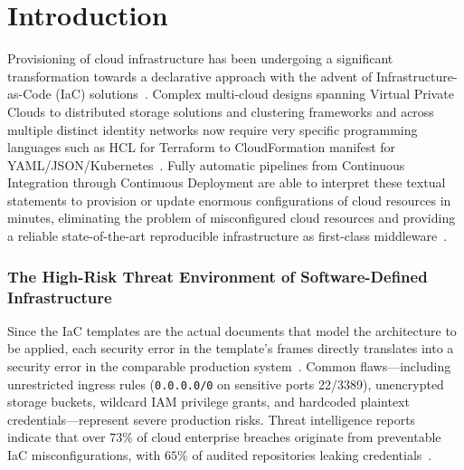 \documentclass[runningheads]{llncs}
\begin{document}
\section{Introduction}
Provisioning of cloud infrastructure has been undergoing a significant transformation towards a declarative approach with the advent of Infrastructure-as-Code (IaC) solutions~\cite{morris2021infrastructure}. Complex multi-cloud designs spanning Virtual Private Clouds to distributed storage solutions and clustering frameworks and across multiple distinct identity networks now require very specific programming languages such as HCL for Terraform to CloudFormation manifest for YAML/JSON/Kubernetes~\cite{guerriero2023static,rahman2023threats}. Fully automatic pipelines from Continuous Integration through Continuous Deployment are able to interpret these textual statements to provision or update enormous configurations of cloud resources in minutes, eliminating the problem of misconfigured cloud resources and providing a reliable state-of-the-art reproducible infrastructure as first-class middleware~\cite{unit42report}.

\subsubsection{The High-Risk Threat Environment of Software-Defined Infrastructure}
Since the IaC templates are the actual documents that model the architecture to be applied, each security error in the template's frames directly translates into a security error in the comparable production system~\cite{datadog2024state}. Common flaws---including unrestricted ingress rules (\texttt{0.0.0.0/0} on sensitive ports 22/3389), unencrypted storage buckets, wildcard IAM privilege grants, and hardcoded plaintext credentials---represent severe production risks. Threat intelligence reports indicate that over $73\%$ of cloud enterprise breaches originate from preventable IaC misconfigurations, with $65\%$ of audited repositories leaking credentials~\cite{unit42report,datadog2024state}.
\end{document}
